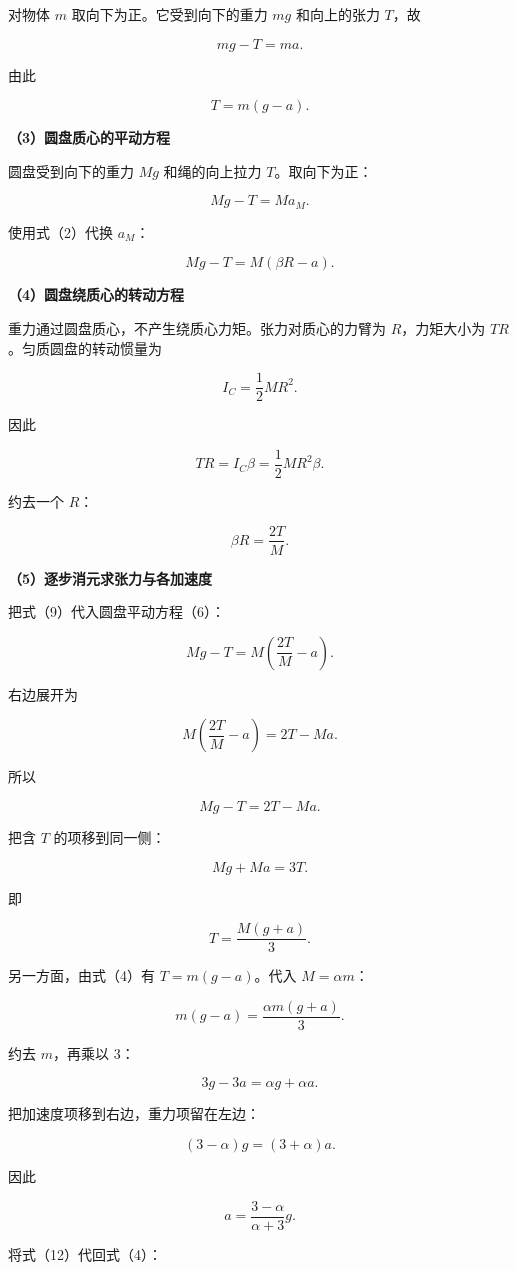 \documentclass[12pt,a4paper,UTF8]{ctexart}
\begin{document}
对物体 \(m\) 取向下为正。它受到向下的重力 \(mg\) 和向上的张力 \(T\)，故

\[
mg-T=ma.
\tag{3}
\]

由此

\[
T=m(g-a).
\tag{4}
\]

\textbf{（3）圆盘质心的平动方程}

圆盘受到向下的重力 \(Mg\) 和绳的向上拉力 \(T\)。取向下为正：

\[
Mg-T=Ma_M.
\tag{5}
\]

使用式（2）代换 \(a_M\)：

\[
Mg-T=M(\beta R-a).
\tag{6}
\]

\textbf{（4）圆盘绕质心的转动方程}

重力通过圆盘质心，不产生绕质心力矩。张力对质心的力臂为 \(R\)，力矩大小为
\(TR\)。匀质圆盘的转动惯量为

\[
I_C=\frac12MR^2.
\tag{7}
\]

因此

\[
TR=I_C\beta
=\frac12MR^2\beta.
\tag{8}
\]

约去一个 \(R\)：

\[
\boxed{\beta R=\frac{2T}{M}}.
\tag{9}
\]

\textbf{（5）逐步消元求张力与各加速度}

把式（9）代入圆盘平动方程（6）：

\[
Mg-T=M\left(\frac{2T}{M}-a\right).
\]

右边展开为

\[
M\left(\frac{2T}{M}-a\right)=2T-Ma.
\]

所以

\[
Mg-T=2T-Ma.
\]

把含 \(T\) 的项移到同一侧：

\[
Mg+Ma=3T.
\tag{10}
\]

即

\[
T=\frac{M(g+a)}3.
\tag{11}
\]

另一方面，由式（4）有 \(T=m(g-a)\)。代入 \(M=\alpha m\)：

\[
m(g-a)=\frac{\alpha m(g+a)}3.
\]

约去 \(m\)，再乘以 \(3\)：

\[
3g-3a=\alpha g+\alpha a.
\]

把加速度项移到右边，重力项留在左边：

\[
(3-\alpha)g=(3+\alpha)a.
\]

因此

\[
\boxed{a=\frac{3-\alpha}{\alpha+3}g}.
\tag{12}
\]

将式（12）代回式（4）：
\end{document}
